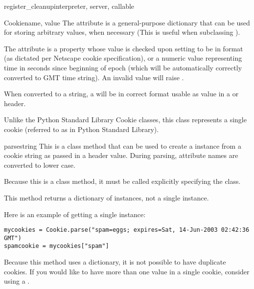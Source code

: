 \begin{funcdesc}{register_cleanup}{interpreter, server, callable}
\begin{classdesc}{Cookie}{name, value}
  The  attribute is a general-purpose dictionary that
  can be used for storing arbitrary values, when necessary (This is
  useful when subclassing ).

  The  attribute is a property whose value is checked
  upon setting to be in format 
  (as dictated per Netscape cookie specification), or a numeric value
  representing time in seconds since beginning of epoch (which will be
  automatically correctly converted to GMT time string). An invalid
   value will raise .

  When converted to a string, a  will be in correct
  format usable as value in a  or 
  header.

  \begin{notice}
    Unlike the Python Standard Library Cookie classes, this
    class represents a single cookie (referred to as  in
    Python Standard Library).
  \end{notice}

  \begin{methoddesc}[Cookie]{parse}{string}
    This is a class method that can be used to create a 
    instance from a cookie string  as passed in a header
    value. During parsing, attribute names are converted to lower
    case.

    Because this is a class method, it must be called explicitly
    specifying the class.

    This method returns a dictionary of  instances, not
    a single  instance.

    Here is an example of getting a single  instance:
    \begin{verbatim}
mycookies = Cookie.parse("spam=eggs; expires=Sat, 14-Jun-2003 02:42:36 GMT")
spamcookie = mycookies["spam"]
    \end{verbatim}

    \begin{notice}
      Because this method uses a dictionary, it is not possible to
      have duplicate cookies. If you would like to have more than one
      value in a single cookie, consider using a .
    \end{notice}

  \end{methoddesc}

\end{classdesc}


\end{funcdesc}
